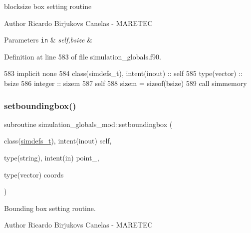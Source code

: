 blocksize box setting routine 

\begin{DoxyAuthor}{Author}
Ricardo Birjukovs Canelas -\/ M\+A\+R\+E\+T\+EC 
\end{DoxyAuthor}

\begin{DoxyParams}[1]{Parameters}
\mbox{\tt in}  & {\em self,bsize} & \\
\hline
\end{DoxyParams}


Definition at line 583 of file simulation\+\_\+globals.\+f90.


\begin{DoxyCode}
583     \textcolor{keywordtype}{implicit none}
584     \textcolor{keywordtype}{class}(simdefs\_t), \textcolor{keywordtype}{intent(inout)} :: self
585     \textcolor{keywordtype}{type}(vector) :: bsize
586     \textcolor{keywordtype}{integer} :: sizem
587     self%
588     sizem = sizeof(bsize)
589     \textcolor{keyword}{call }simmemory%
\end{DoxyCode}
\mbox{\label{namespacesimulation__globals__mod_a412b0779703630189e2ea14e4b390864}} 
\subsubsection{\texorpdfstring{setboundingbox()}{setboundingbox()}}
{\footnotesize\ttfamily subroutine simulation\+\_\+globals\+\_\+mod\+::setboundingbox (\begin{DoxyParamCaption}\item[{class(\mbox{\hyperlink{structsimulation__globals__mod_1_1simdefs__t}{simdefs\+\_\+t}}), intent(inout)}]{self,  }\item[{type(string), intent(in)}]{point\+\_\+,  }\item[{type(vector)}]{coords }\end{DoxyParamCaption})\hspace{0.3cm}{\ttfamily [private]}}



Bounding box setting routine. 

\begin{DoxyAuthor}{Author}
Ricardo Birjukovs Canelas -\/ M\+A\+R\+E\+T\+EC 
\end{DoxyAuthor}

